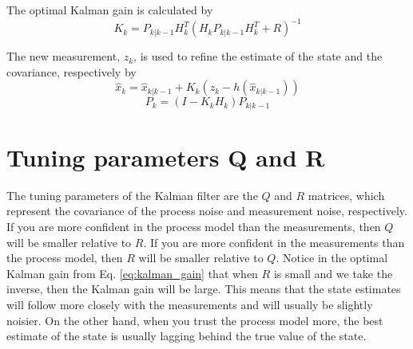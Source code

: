 \documentclass{article}
\begin{document}
	The optimal Kalman gain is calculated by
	\begin{equation} \label{eq:kalman_gain}
		K_k = P_{k|k-1}H^T_k(H_kP_{k|k-1}H^T_k + R)^{-1}
	\end{equation}
	
	The new measurement, $z_k$, is used to refine the estimate of the state and the covariance, respectively by
	\begin{equation}
		\hat{x}_k = \hat{x}_{k|k-1} + K_k(z_k-h(\hat{x}_{k|k-1}))
	\end{equation}
	\begin{equation}
		P_k = (I - K_kH_k)P_{k|k-1}
	\end{equation}
	
	\section{Tuning parameters Q and R}
	The tuning parameters of the Kalman filter are the $Q$ and $R$ matrices, which represent the covariance of the process noise and measurement noise, respectively. If you are more confident in the process model than the measurements, then $Q$ will be smaller relative to $R$. If you are more confident in the measurements than the process model, then $R$ will be smaller relative to $Q$. Notice in the optimal Kalman gain from Eq. \ref{eq:kalman_gain} that when $R$ is small and we take the inverse, then the Kalman gain will be large. This means that the state estimates will follow more closely with the measurements and will usually be slightly noisier. On the other hand, when you trust the process model more, the best estimate of the state is usually lagging behind the true value of the state. 
\end{document}
